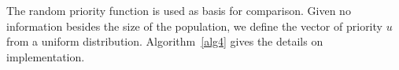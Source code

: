 The random priority function is used as basis for comparison. Given no information besides the size of the population, we define the vector of priority $u$ from a uniform distribution. Algorithm~\ref{alg4} gives the details on implementation. 
%
%
%
%
% 
%




